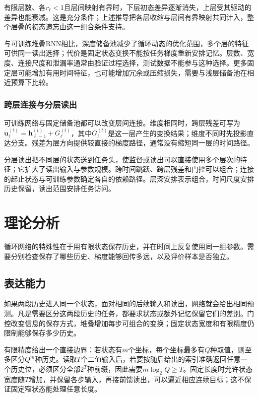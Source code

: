 有限层数、各$r_\ell<1$且层间映射有界时，下层初态差异逐渐消失，上层受其驱动的差异也能衰减。这是充分条件；上述推导把各层收缩与层间有界映射共同计入，整个层叠的初态遗忘由这一组合条件支持。

与可训练堆叠RNN相比，深度储备池减少了循环动态的优化范围，多个层的特征可供同一读出选择；代价是固定状态变换不能按任务梯度重新安排记忆。层数、宽度、连接尺度和泄漏率通常由验证过程选择，测试数据不能参与这种选择。更多固定层可能增加有用时间特征，也可能增加冗余或压缩损失，需要与浅层储备池在相近预算下比较。

\subsubsection{跨层连接与分层读出}
\label{sec:rnn-depth-connections}

可训练网络与固定储备池都可以改变层间连接。维度相同时，跨层残差可写为$\bm u_\ell^{(t)}=\bm h_{\ell-1}^{(t)}+G_\ell^{(t)}$，其中$G_\ell^{(t)}$是这一层产生的变换结果；维度不同时先投影直达分支。残差为层方向提供较直接的梯度路径，通常没有缩短同一层的时间路径。

分层读出把不同层的状态送到任务头，使监督或读出可以直接使用多个层次的特征；它扩大了读出输入与参数规模。跨时间跳跃、跨层残差和门控可以组合；连接的起止状态与可训练参数确定各自的依赖路径。层深安排表示组合，时间尺度安排历史保留，读出范围安排任务访问。

\FloatBarrier

\section{理论分析}
\label{sec:rnn-theory}

循环网络的特殊性在于用有限状态保存历史，并在时间上反复使用同一组参数。需要分别检查保存了哪些历史、梯度能够回传多远，以及评价样本是否独立。

\subsection{表达能力}
\label{sec:rnn-expressivity}

如果两段历史进入同一个状态，面对相同的后续输入和读出，网络就会给出相同预测。凡是需要区分这两段历史的任务，都要求状态或额外记忆保留它们的差别。门控改变信息的保存方式，堆叠增加每步可组合的变换；固定状态宽度和有限精度仍限制能够保存多少历史。

有限精度给出一个直接边界：若状态有$m$个坐标，每个坐标最多有$Q$种取值，则至多区分$Q^m$种历史。读取$T$个二值输入后，若要按随后给出的索引准确返回任意一个历史位，必须区分全部$2^T$种前缀，因此需要$m\log_2 Q\geq T$。固定长度时允许状态宽度随$T$增加，并保留各步输入，再接前馈读出，可以逼近相应连续目标；这不保证固定窄状态能处理任意长度。

